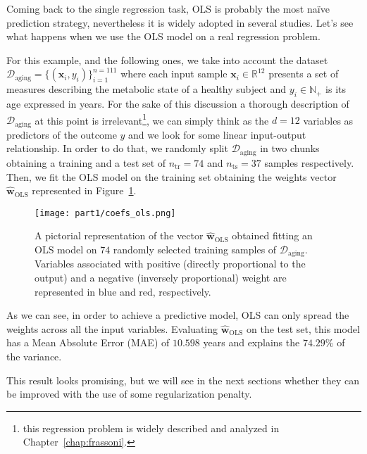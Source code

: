 			Coming back to the single regression task, OLS is probably the most na\"ive prediction strategy, nevertheless it is widely adopted in several studies. Let's see what happens when we use the OLS model on a real regression problem.

			For this example, and the following ones, we take into account the dataset $\mathcal{D}_{\text{aging}} = \{(\bm{x}_i, y_i)\}_{i=1}^{n=111}$ where each input sample $\bm{x}_i \in \mathbb{R}^{12}$ presents a set of measures describing the metabolic state of a healthy subject and $y_i \in \mathbb{N}_+$ is its age expressed in years.
			For the sake of this discussion a  thorough description of $\mathcal{D}_{\text{aging}}$ at this point is irrelevant\footnote{this regression problem is widely described and analyzed in Chapter~\ref{chap:frassoni}.}, we can simply think as the $d=12$ variables as predictors of the outcome $y$ and we look for some linear input-output relationship.
			In order to do that, we randomly split $\mathcal{D}_{\text{aging}}$ in two chunks obtaining a training and a test set of $n_{\text{tr}}=74$ and $n_{\text{ts}}=37$ samples respectively. Then, we fit the OLS model on the training set obtaining the weights vector $\bm{\hat w}_{\text{OLS}}$ represented in Figure~\ref{fig:coefs_ols}.
			\begin{figure}[!h]
				\centering
				\texttt{[image: part1/coefs\_ols.png]}
				\caption{A pictorial representation of the vector $\bm{\hat w}_{\text{OLS}}$ obtained fitting an OLS model on $74$ randomly selected training samples of $\mathcal{D}_{\text{aging}}$. Variables associated with positive (\ie directly proportional to the output) and a negative (\ie inversely proportional) weight are represented in blue and red, respectively.} \label{fig:coefs_ols}
		  \end{figure}
			As we can see, in order to achieve a predictive model, OLS can only spread the weights across all the input variables. Evaluating $\bm{\hat w}_{\text{OLS}}$ on the test set, this model has a Mean Absolute Error (\ac{MAE}) of $10.598$ years and explains the $74.29\%$ of the variance.

			This result looks promising, but we will see in the next sections whether they can be improved with the use of some regularization penalty.



